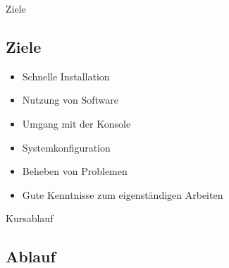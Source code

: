 \begin{frame}{Ziele}
    \subsection{Ziele}\label{subsec:ziele}

    \begin{itemize}
        \item Schnelle Installation
        \item Nutzung von Software
        \item Umgang mit der Konsole
        \item Systemkonfiguration
        \item Beheben von Problemen
        \item Gute Kenntnisse zum eigenständigen Arbeiten
    \end{itemize}

\end{frame}

\begin{frame}{Kursablauf}
    \subsection{Ablauf}\label{subsec:ablauf}

\end{frame}